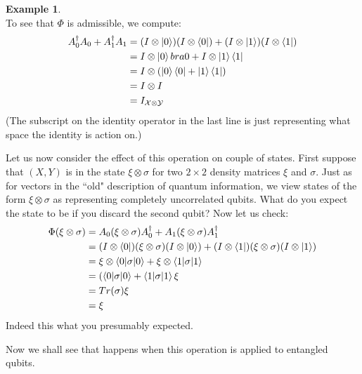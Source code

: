 \documentclass[12pt, oneside]{book}
\theoremstyle{definition}
\theoremstyle{definition}
\newtheorem{example}{Example}[section]
\theoremstyle{remark}
\begin{document}
\begin{example}
\[    \]
    To see that $\Phi$ is admissible, we compute:
    \begin{align*}
    A_0^{\dagger}A_0+A_1^{\dagger}A_1&=(I\otimes \ket{0})(I\otimes \bra{0})+(I\otimes \ket{1})(I\otimes \bra{1})\\
    &=I\otimes \ket{0}bra{0}+I\otimes \ket{1}\bra{1}\\
    &=I\otimes (\ket{0}\bra{0}+\ket{1}\bra{1})\\
    &=I\otimes I\\
    &=I_{\mathcal{X} \otimes \mathcal{Y}}
    \end{align*}
    (The subscript on the identity operator in the last line is just representing what space the identity is action on.) 
\end{example}
Let us now consider the effect of this operation on couple of states. First suppose that $(X,Y)$ is in the state $\xi \otimes \sigma$ for two $2 \times 2$ density matrices $\xi$ and $\sigma$. Just as for vectors in the ``old" description of quantum information, we view states of the form $\xi \otimes \sigma$ as representing completely uncorrelated qubits. What do you expect the state to be if you discard the second qubit? Now let us check:
\begin{align*}
\Phi(\xi \otimes \sigma)&=A_0(\xi \otimes \sigma)A_0^{\dagger}+A_1(\xi \otimes \sigma)A_1^{\dagger}\\
&=(I\otimes \bra{0})(\xi \otimes \sigma)(I\otimes \ket{0})+(I \otimes \bra{1})(\xi \otimes \sigma)(I\otimes \ket{1})\\
&=\xi \otimes \braket{0|\sigma|0} +\xi \otimes \braket{1|\sigma|1}\\
&=(\braket{0|\sigma|0} + \braket{1|\sigma|1} \xi\\
&=Tr(\sigma)\xi\\
&=\xi
\end{align*}
Indeed this what you presumably expected.

Now we shall see that happens when this operation is applied to entangled qubits.
\end{document}

